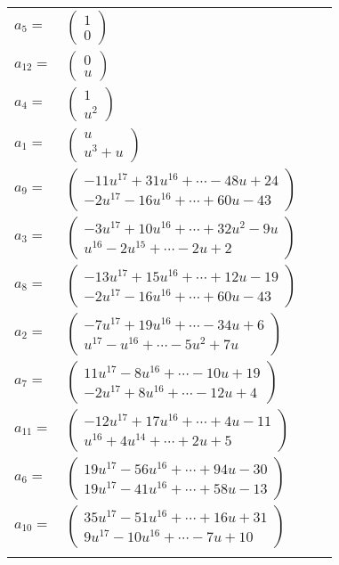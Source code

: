 \documentclass[1p]{elsarticle_modified}
\theoremstyle{definition}
\begin{document}
\begin{tabular}{m{7pt} m{180pt} m{7pt} m{180pt} }
\flushright $a_{5}=$&$\begin{pmatrix}1\\0\end{pmatrix}$ \\
\flushright $a_{12}=$&$\begin{pmatrix}0\\u\end{pmatrix}$ \\
\flushright $a_{4}=$&$\begin{pmatrix}1\\u^2\end{pmatrix}$ \\
\flushright $a_{1}=$&$\begin{pmatrix}u\\u^3+u\end{pmatrix}$ \\
\flushright $a_{9}=$&$\begin{pmatrix}-11 u^{17}+31 u^{16}+\cdots-48 u+24\\-2 u^{17}-16 u^{16}+\cdots+60 u-43\end{pmatrix}$ \\
\flushright $a_{3}=$&$\begin{pmatrix}-3 u^{17}+10 u^{16}+\cdots+32 u^2-9 u\\u^{16}-2 u^{15}+\cdots-2 u+2\end{pmatrix}$ \\
\flushright $a_{8}=$&$\begin{pmatrix}-13 u^{17}+15 u^{16}+\cdots+12 u-19\\-2 u^{17}-16 u^{16}+\cdots+60 u-43\end{pmatrix}$ \\
\flushright $a_{2}=$&$\begin{pmatrix}-7 u^{17}+19 u^{16}+\cdots-34 u+6\\u^{17}- u^{16}+\cdots-5 u^2+7 u\end{pmatrix}$ \\
\flushright $a_{7}=$&$\begin{pmatrix}11 u^{17}-8 u^{16}+\cdots-10 u+19\\-2 u^{17}+8 u^{16}+\cdots-12 u+4\end{pmatrix}$ \\
\flushright $a_{11}=$&$\begin{pmatrix}-12 u^{17}+17 u^{16}+\cdots+4 u-11\\u^{16}+4 u^{14}+\cdots+2 u+5\end{pmatrix}$ \\
\flushright $a_{6}=$&$\begin{pmatrix}19 u^{17}-56 u^{16}+\cdots+94 u-30\\19 u^{17}-41 u^{16}+\cdots+58 u-13\end{pmatrix}$ \\
\flushright $a_{10}=$&$\begin{pmatrix}35 u^{17}-51 u^{16}+\cdots+16 u+31\\9 u^{17}-10 u^{16}+\cdots-7 u+10\end{pmatrix}$\\&\end{tabular}
\end{document}
